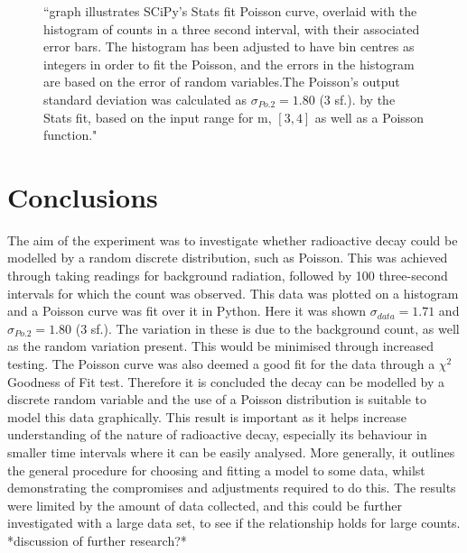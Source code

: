 \documentclass[11pt]{article}
\begin{document}
       \begin{figure}[]
        \begin{center}
            \def\svgwidth{\columnwidth}
            
             \caption{“graph illustrates SCiPy's Stats fit Poisson curve, overlaid with the histogram of counts in a three second interval, with their associated error bars. The histogram has been adjusted to have bin centres as integers in order to fit the Poisson, and the errors in the histogram are based on the error of random variables.The Poisson's output standard deviation was calculated as $\sigma_{Po.2} = 1.80$ (3 sf.). by the Stats fit,  based on the input range for m, $[3,4]$ as well as a Poisson function."}
             \label{fig:experimental results 1}
        \end{center}
    \end{figure}
    \section{Conclusions}
The aim of the experiment was to investigate whether radioactive decay could be modelled by a random discrete distribution, such as Poisson. This was achieved through taking readings for background radiation, followed by 100 three-second intervals for which the count was observed. This data was plotted on a histogram and a Poisson curve was fit over it in Python. Here it was shown $\sigma_{data} = 1.71$ and $\sigma_{Po.2} = 1.80$ (3 sf.). The variation in these is due to the background count, as well as the random variation present. This would be minimised through increased testing. The Poisson curve was also deemed a good fit for the data through a $\chi^{2}$ Goodness of Fit test. Therefore it is  concluded the decay can be modelled by a discrete random variable and the use of a Poisson distribution is suitable to model this data graphically.
This result is important as it helps increase understanding of the nature of radioactive decay, especially its behaviour in smaller time intervals where it can be easily analysed. More generally, it outlines the general procedure for choosing and fitting a model to some data, whilst demonstrating the compromises and adjustments required to do this. The results were limited by the amount of data collected, and this could be further investigated with a large data set, to see if the relationship holds for large counts. 
*discussion of further research?*
\end{document}
